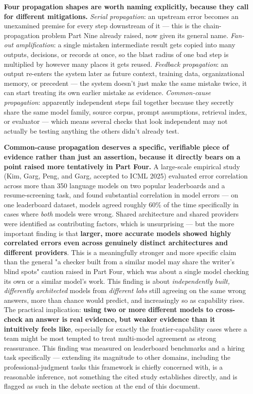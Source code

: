 \textbf{Four propagation shapes are worth naming explicitly, because they call for different mitigations.} \emph{Serial propagation}: an upstream error becomes an unexamined premise for every step downstream of it --- this is the chain-propagation problem Part Nine already raised, now given its general name. \emph{Fan-out amplification}: a single mistaken intermediate result gets copied into many outputs, decisions, or records at once, so the blast radius of one bad step is multiplied by however many places it gets reused. \emph{Feedback propagation}: an output re-enters the system later as future context, training data, organizational memory, or precedent --- the system doesn't just make the same mistake twice, it can start treating its own earlier mistake as evidence. \emph{Common-cause propagation}: apparently independent steps fail together because they secretly share the same model family, source corpus, prompt assumptions, retrieval index, or evaluator --- which means several checks that look independent may not actually be testing anything the others didn't already test.

\textbf{Common-cause propagation deserves a specific, verifiable piece of evidence rather than just an assertion, because it directly bears on a point raised more tentatively in Part Four.} A large-scale empirical study (Kim, Garg, Peng, and Garg, accepted to ICML 2025) evaluated error correlation across more than 350 language models on two popular leaderboards and a resume-screening task, and found substantial correlation in model errors --- on one leaderboard dataset, models agreed roughly 60\% of the time specifically in cases where \emph{both} models were wrong. Shared architecture and shared providers were identified as contributing factors, which is unsurprising --- but the more important finding is that \textbf{larger, more accurate models showed highly correlated errors even across genuinely distinct architectures and different providers}. This is a meaningfully stronger and more specific claim than the general "a checker built from a similar model may share the writer's blind spots" caution raised in Part Four, which was about a single model checking its own or a similar model's work. This finding is about \emph{independently built, differently architected} models from \emph{different labs} still agreeing on the same wrong answers, more than chance would predict, and increasingly so as capability rises. The practical implication: \textbf{using two or more different models to cross-check an answer is real evidence, but weaker evidence than it intuitively feels like}, especially for exactly the frontier-capability cases where a team might be most tempted to treat multi-model agreement as strong reassurance. This finding was measured on leaderboard benchmarks and a hiring task specifically --- extending its magnitude to other domains, including the professional-judgment tasks this framework is chiefly concerned with, is a reasonable inference, not something the cited study establishes directly, and is flagged as such in the debate section at the end of this document.

